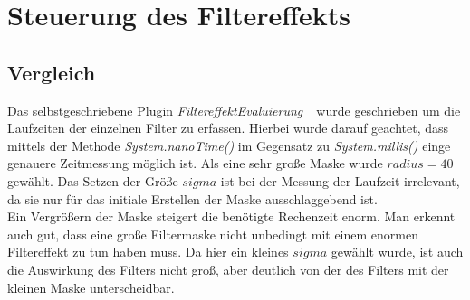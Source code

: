 \documentclass[12pt,german]{article}
\begin{document}
\newpage
\section{Steuerung des Filtereffekts }

\subsection{Vergleich}
Das selbstgeschriebene Plugin \textit{FiltereffektEvaluierung\_} wurde geschrieben um die Laufzeiten der einzelnen Filter zu erfassen. Hierbei wurde darauf geachtet, dass mittels der Methode \textit{System.nanoTime()} im Gegensatz zu \textit{System.millis()} einge genauere Zeitmessung möglich ist. Als eine sehr große Maske wurde $  radius = 40 $ gewählt. Das Setzen der Größe $ sigma $ ist bei der Messung der Laufzeit irrelevant, da sie nur für das initiale Erstellen der Maske ausschlaggebend ist. \\

Ein Vergrößern der Maske steigert die benötigte Rechenzeit enorm. Man erkennt auch gut, dass eine große Filtermaske nicht unbedingt mit einem enormen Filtereffekt zu tun haben muss. Da hier ein kleines $sigma$ gewählt wurde, ist auch die Auswirkung des Filters nicht groß, aber deutlich von der des Filters mit der kleinen Maske unterscheidbar.
\end{document}

